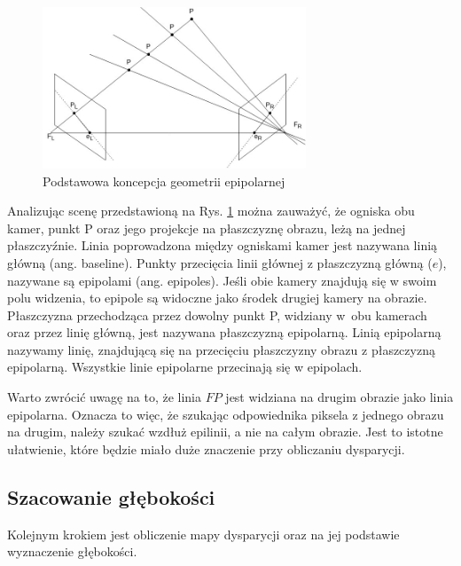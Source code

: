 \documentclass[oneside, eng]{mgr}
\begin{document}
\begin{figure}
\centering
	\includegraphics[width=0.70\textwidth]{img/epipolar.jpg}\par\vspace{1cm}
\caption{Podstawowa koncepcja geometrii epipolarnej}
	\label{fig:epipolar_scene}
\end{figure}

Analizując scenę przedstawioną na Rys. \ref{fig:epipolar_scene} można zauważyć, że ogniska obu kamer, punkt P oraz jego projekcje na płaszczyznę obrazu, leżą na jednej płaszczyźnie. Linia poprowadzona między ogniskami kamer jest nazywana linią główną (ang. baseline). 
Punkty przecięcia linii głównej z płaszczyzną główną ($e$), nazywane są epipolami (ang. epipoles). Jeśli obie kamery znajdują się w swoim polu widzenia, to epipole są widoczne jako środek drugiej kamery na obrazie.
Płaszczyzna przechodząca przez dowolny punkt P, widziany w~obu kamerach oraz przez linię główną, jest nazywana płaszczyzną epipolarną.
Linią epipolarną nazywamy linię, znajdującą się na przecięciu płaszczyzny obrazu z płaszczyzną epipolarną. Wszystkie linie epipolarne przecinają się w epipolach.

Warto zwrócić uwagę na to, że linia $F P$ jest widziana na drugim obrazie jako linia epipolarna. Oznacza to więc, że szukając odpowiednika piksela z jednego obrazu na drugim, należy szukać wzdłuż epilinii, a nie na całym obrazie. Jest to istotne ułatwienie, które będzie miało duże znaczenie przy obliczaniu dysparycji.

\subsection{Szacowanie głębokości}

Kolejnym krokiem jest obliczenie mapy dysparycji oraz na jej podstawie wyznaczenie głębokości. 
\end{document}

